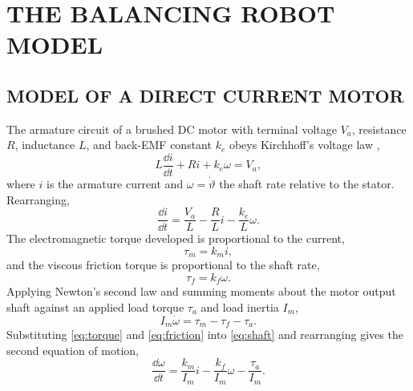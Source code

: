 \chapter{THE BALANCING ROBOT MODEL}
\label{ch:model}

\section{MODEL OF A DIRECT CURRENT MOTOR}
\label{sec:motor}

The armature circuit of a brushed DC motor with terminal voltage $V_a$,
resistance $R$, inductance $L$, and back-EMF constant $k_e$ obeys Kirchhoff's
voltage law \cite{desilva2004mechatronics},
\begin{equation}\label{eq:circuit}
L\frac{\dd i}{\dd t}+Ri+k_e\omega=V_a ,
\end{equation}
where $i$ is the armature current and $\omega=\dot\vartheta$ the shaft rate
relative to the stator. Rearranging,
\begin{equation}\label{eq:circuit2}
\frac{\dd i}{\dd t}=\frac{V_a}{L}-\frac{R}{L}i-\frac{k_e}{L}\omega .
\end{equation}
The electromagnetic torque developed is proportional to the current,
\begin{equation}\label{eq:torque}
\tau_m=k_mi ,
\end{equation}
and the viscous friction torque is proportional to the shaft rate,
\begin{equation}\label{eq:friction}
\tau_f=k_f\omega .
\end{equation}
Applying Newton's second law and summing moments about the motor output shaft
against an applied load torque $\tau_a$ and load inertia $I_m$,
\begin{equation}\label{eq:shaft}
I_m\dot\omega=\tau_m-\tau_f-\tau_a .
\end{equation}
Substituting \eqref{eq:torque} and \eqref{eq:friction} into \eqref{eq:shaft} and
rearranging gives the second equation of motion,
\begin{equation}\label{eq:shaft2}
\frac{\dd\omega}{\dd t}=\frac{k_m}{I_m}i-\frac{k_f}{I_m}\omega-\frac{\tau_a}{I_m} .
\end{equation}

